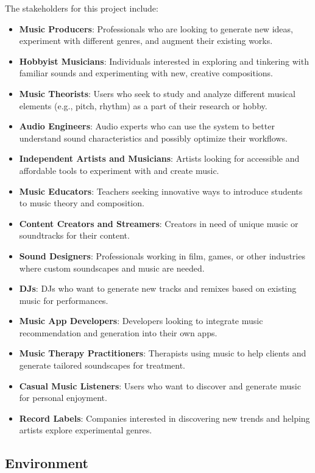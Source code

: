\documentclass{article}
\begin{document}
The stakeholders for this project include:
\begin{itemize}
    \item \textbf{Music Producers}: Professionals who are looking to generate new ideas, experiment with different genres, and augment their existing works.
    \item \textbf{Hobbyist Musicians}: Individuals interested in exploring and tinkering with familiar sounds and experimenting with new, creative compositions.
    \item \textbf{Music Theorists}: Users who seek to study and analyze different musical elements (e.g., pitch, rhythm) as a part of their research or hobby.
    \item \textbf{Audio Engineers}: Audio experts who can use the system to better understand sound characteristics and possibly optimize their workflows.
    \item \textbf{Independent Artists and Musicians}: Artists looking for accessible and affordable tools to experiment with and create music.
    \item \textbf{Music Educators}: Teachers seeking innovative ways to introduce students to music theory and composition.
    \item \textbf{Content Creators and Streamers}: Creators in need of unique music or soundtracks for their content.
    \item \textbf{Sound Designers}: Professionals working in film, games, or other industries where custom soundscapes and music are needed.
    \item \textbf{DJs}: DJs who want to generate new tracks and remixes based on existing music for performances.
    \item \textbf{Music App Developers}: Developers looking to integrate music recommendation and generation into their own apps.
    \item \textbf{Music Therapy Practitioners}: Therapists using music to help clients and generate tailored soundscapes for treatment.
    \item \textbf{Casual Music Listeners}: Users who want to discover and generate music for personal enjoyment.
    \item \textbf{Record Labels}: Companies interested in discovering new trends and helping artists explore experimental genres.
\end{itemize}


\subsection{Environment}
\end{document}
